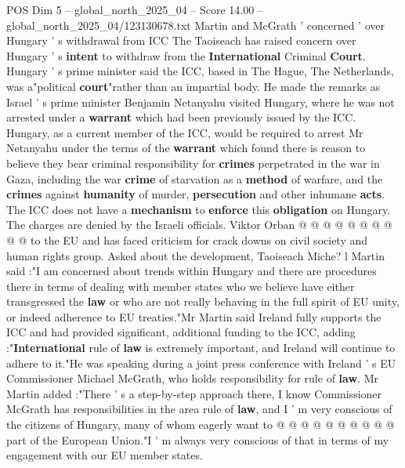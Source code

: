 \begin{textsample}{POS Dim 5 – global\_north\_2025\_04 – Score 14.00 – global\_north\_2025\_04/123130678.txt}  \label{ex:f5_pos_097}
Martin and McGrath ' concerned ' over Hungary ' s withdrawal from ICC The Taoiseach has raised concern over Hungary ' s \textbf{intent} to withdraw from the \textbf{International} Criminal \textbf{Court}.
Hungary ' s prime minister said the ICC, based in The Hague, The Netherlands, was a"political \textbf{court}"rather than an impartial body.
He made the remarks as Israel ' s prime minister Benjamin Netanyahu visited Hungary, where he was not arrested under a \textbf{warrant} which had been previously issued by the ICC.
Hungary, as a current member of the ICC, would be required to arrest Mr Netanyahu under the terms of the \textbf{warrant} which found there is reason to believe they bear criminal responsibility for \textbf{crimes} perpetrated in the war in Gaza, including the war \textbf{crime} of starvation as a \textbf{method} of warfare, and the \textbf{crimes} against \textbf{humanity} of murder, \textbf{persecution} and other inhumane \textbf{acts}.
The ICC does not have a \textbf{mechanism} to \textbf{enforce} this \textbf{obligation} on Hungary.
The charges are denied by the Israeli officials.
Viktor Orban @ @ @ @ @ @ @ @ @ @ to the EU and has faced criticism for crack downs on civil society and human rights group.
Asked about the development, Taoiseach Miche? l Martin said :"I am concerned about trends within Hungary and there are procedures there in terms of dealing with member states who we believe have either transgressed the \textbf{law} or who are not really behaving in the full spirit of EU unity, or indeed adherence to EU treaties."Mr Martin said Ireland fully supports the ICC and had provided significant, additional funding to the ICC, adding :"\textbf{International} rule of \textbf{law} is extremely important, and Ireland will continue to adhere to it."He was speaking during a joint press conference with Ireland ' s EU Commissioner Michael McGrath, who holds responsibility for rule of \textbf{law}.
Mr Martin added :"There ' s a step-by-step approach there, I know Commissioner McGrath has responsibilities in the area rule of \textbf{law}, and I ' m very conscious of the citizens of Hungary, many of whom eagerly want to @ @ @ @ @ @ @ @ @ @ part of the European Union."I ' m always very conscious of that in terms of my engagement with our EU member states.

\end{textsample}
